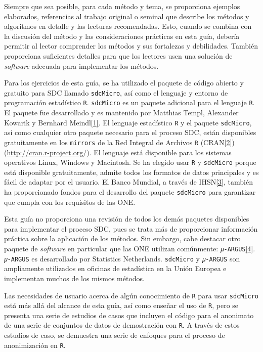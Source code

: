 \documentclass[
]{book}
\theoremstyle{definition}
\theoremstyle{definition}
\theoremstyle{definition}
\theoremstyle{definition}
\theoremstyle{remark}
\begin{document}
Siempre que sea posible, para cada método y tema, se proporciona ejemplos elaborados, referencias al trabajo original o seminal que describe los métodos y algoritmos en detalle y las lecturas recomendadas. Esto, cuando se combina con la discusión del método y las consideraciones prácticas en esta guía, debería permitir al lector comprender los métodos y sus fortalezas y debilidades. También proporciona suficientes detalles para que los lectores usen una solución de \emph{software} adecuada para implementar los métodos.

Para los ejercicios de esta guía, se ha utilizado el paquete de código abierto y gratuito para SDC llamado \texttt{sdcMicro}, así como el lenguaje y entorno de programación estadístico \texttt{R}. \texttt{sdcMicro} es un paquete adicional para el lenguaje \texttt{R}. El paquete fue desarrollado y es mantenido por Matthias Templ, Alexander Kowarik y Bernhard Meindl\protect\hyperlink{_ftn1}{{[}1{]}}. El lenguaje estadístico \texttt{R} y el paquete \texttt{sdcMicro}, así como cualquier otro paquete necesario para el proceso SDC, están disponibles gratuitamente en los \texttt{mirrors} de la Red Integral de Archivos \texttt{R} (CRAN\protect\hyperlink{_ftn2}{{[}2{]}}) (\url{http://cran.r-project.org}/). El lenguaje está disponible para los sistemas operativos Linux, Windows y Macintosh. Se ha elegido usar \texttt{R} y \texttt{sdcMicro} porque está disponible gratuitamente, admite todos los formatos de datos principales y es fácil de adaptar por el usuario. El Banco Mundial, a través de IHSN\protect\hyperlink{_ftn3}{{[}3{]}}, también ha proporcionado fondos para el desarrollo del paquete \texttt{sdcMicro} para garantizar que cumpla con los requisitos de las ONE.

Esta guía no proporciona una revisión de todos los demás paquetes disponibles para implementar el proceso SDC, pues se trata más de proporcionar información práctica sobre la aplicación de los métodos. Sin embargo, cabe destacar otro paquete de \emph{software} en particular que las ONE utilizan comúnmente: \texttt{𝜇-ARGUS}\protect\hyperlink{_ftn4}{{[}4{]}}. \texttt{𝜇-ARGUS} es desarrollado por Statistics Netherlands. \texttt{sdcMicro} y \texttt{𝜇-ARGUS} son ampliamente utilizados en oficinas de estadística en la Unión Europea e implementan muchos de los mismos métodos.

Las necesidades de usuario acerca de algún conocimiento de \texttt{R} para usar \texttt{sdcMicro} está más allá del alcance de esta guía, así como enseñar el uso de \texttt{R}, pero se presenta una serie de estudios de casos que incluyen el código para el anonimato de una serie de conjuntos de datos de demostración con \texttt{R}. A través de estos estudios de caso, se demuestra una serie de enfoques para el proceso de anonimización en \texttt{R}.
\end{document}
